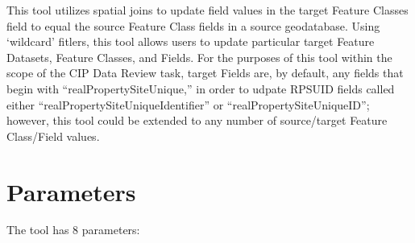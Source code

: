 \documentclass[openany]{book}
\theoremstyle{definition}
\theoremstyle{definition}
\theoremstyle{definition}
\theoremstyle{remark}
\begin{document}
This tool utilizes spatial joins to update field values in the target
Feature Classes field to equal the source Feature Class fields in a
source geodatabase. Using `wildcard' fitlers, this tool allows users to
update particular target Feature Datasets, Feature Classes, and Fields.
For the purposes of this tool within the scope of the CIP Data Review
task, target Fields are, by default, any fields that begin with
``realPropertySiteUnique,'' in order to udpate RPSUID fields called
either ``realPropertySiteUniqueIdentifier'' or
``realPropertySiteUniqueID''; however, this tool could be extended to
any number of source/target Feature Class/Field values.

\section{Parameters}\label{parameters-3}

The tool has 8 parameters:
\end{document}
